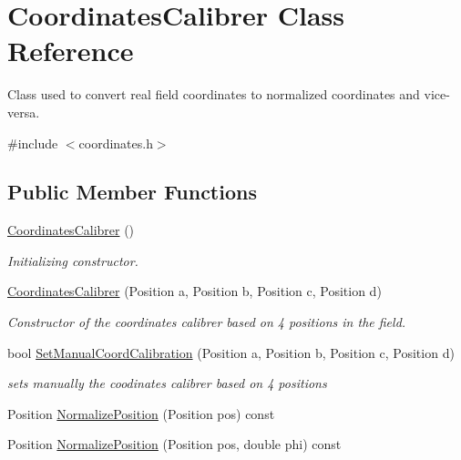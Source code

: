 \hypertarget{classCoordinatesCalibrer}{
\section{CoordinatesCalibrer Class Reference}
\label{classCoordinatesCalibrer}
}


Class used to convert real field coordinates to normalized coordinates and vice-\/versa.  




{\ttfamily \#include $<$coordinates.h$>$}

\subsection*{Public Member Functions}
\begin{DoxyCompactItemize}
\item 
\hyperlink{classCoordinatesCalibrer_ac9a522299ada8f2e58ed8f0c91f4f396}{CoordinatesCalibrer} ()
\begin{DoxyCompactList}\small\item\em Initializing constructor. \item\end{DoxyCompactList}\item 
\hyperlink{classCoordinatesCalibrer_a3b6304945fa64ac97a1b0bbc78753155}{CoordinatesCalibrer} (Position a, Position b, Position c, Position d)
\begin{DoxyCompactList}\small\item\em Constructor of the coordinates calibrer based on 4 positions in the field. \item\end{DoxyCompactList}\item 
bool \hyperlink{classCoordinatesCalibrer_a006c18905b14e4780b9fc74fe26649fc}{SetManualCoordCalibration} (Position a, Position b, Position c, Position d)
\begin{DoxyCompactList}\small\item\em sets manually the coodinates calibrer based on 4 positions \item\end{DoxyCompactList}\item 
Position \hyperlink{classCoordinatesCalibrer_ad6519b69842756c256922d14d1e248ce}{NormalizePosition} (Position pos) const 
\item 
Position \hyperlink{classCoordinatesCalibrer_a034180f011c23565b9b5907ce0219fbf}{NormalizePosition} (Position pos, double phi) const 

\end{DoxyCompactItemize}
